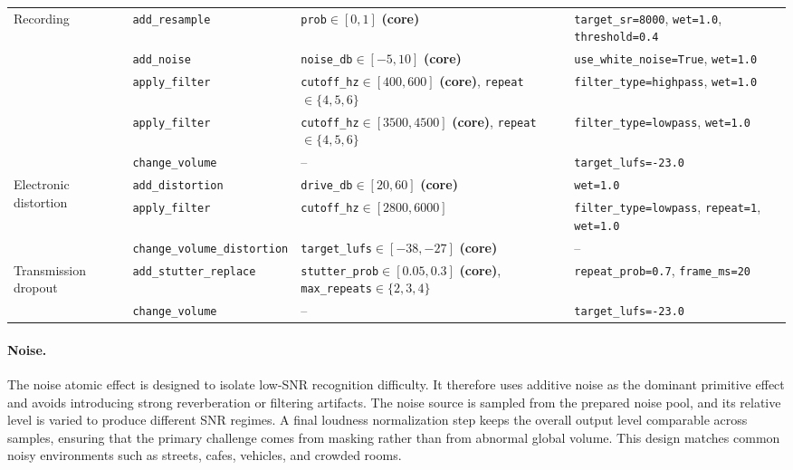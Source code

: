 \documentclass{article}
\begin{document}
\begin{table}[t]
\begin{tabular}{p{} p{} p{} p{}}
\midrule
\multirow{5}{*}{Recording}
& \texttt{add\_resample}
& \texttt{prob}$\in[0,1]$ \textbf{(core)}
& \texttt{target\_sr=8000}, \texttt{wet=1.0}, \texttt{threshold=0.4} \\
& \texttt{add\_noise}
& \texttt{noise\_db}$\in[-5,10]$ \textbf{(core)}
& \texttt{use\_white\_noise=True}, \texttt{wet=1.0} \\
& \texttt{apply\_filter}
& \texttt{cutoff\_hz}$\in[400,600]$ \textbf{(core)}, \texttt{repeat}$\in\{4,5,6\}$
& \texttt{filter\_type=highpass}, \texttt{wet=1.0} \\
& \texttt{apply\_filter}
& \texttt{cutoff\_hz}$\in[3500,4500]$ \textbf{(core)}, \texttt{repeat}$\in\{4,5,6\}$
& \texttt{filter\_type=lowpass}, \texttt{wet=1.0} \\
& \texttt{change\_volume}
& --
& \texttt{target\_lufs=-23.0} \\

\midrule
\multirow{3}{*}{Electronic distortion}
& \texttt{add\_distortion}
& \texttt{drive\_db}$\in[20,60]$ \textbf{(core)}
& \texttt{wet=1.0} \\
& \texttt{apply\_filter}
& \texttt{cutoff\_hz}$\in[2800,6000]$
& \texttt{filter\_type=lowpass}, \texttt{repeat=1}, \texttt{wet=1.0} \\
& \texttt{change\_volume\_distortion}
& \texttt{target\_lufs}$\in[-38,-27]$ \textbf{(core)}
& -- \\

\midrule
\multirow{2}{*}{Transmission dropout}
& \texttt{add\_stutter\_replace}
& \texttt{stutter\_prob}$\in[0.05,0.3]$ \textbf{(core)}, \texttt{max\_repeats}$\in\{2,3,4\}$
& \texttt{repeat\_prob=0.7}, \texttt{frame\_ms=20} \\
& \texttt{change\_volume}
& --
& \texttt{target\_lufs=-23.0} \\

\bottomrule
\end{tabular}
\end{table}

\paragraph{Noise.}
The noise atomic effect is designed to isolate low-SNR recognition difficulty.
It therefore uses additive noise as the dominant primitive effect and avoids
introducing strong reverberation or filtering artifacts. The noise source is
sampled from the prepared noise pool, and its relative level is varied to
produce different SNR regimes. A final loudness normalization step keeps the
overall output level comparable across samples, ensuring that the primary
challenge comes from masking rather than from abnormal global volume. This
design matches common noisy environments such as streets, cafes, vehicles, and
crowded rooms.
\end{document}
